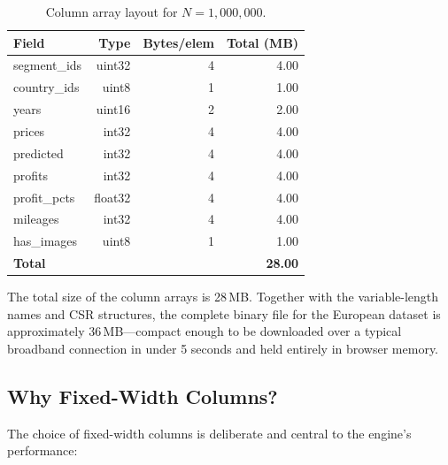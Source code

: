 \documentclass[11pt,a4paper,twoside]{book}
\begin{document}
\begin{table}[H]
\centering
\caption{Column array layout for $N = 1,\!000,\!000$.}
\label{tab:columns}
\begin{tabular}{@{}lrrr@{}}
\toprule
\textbf{Field} & \textbf{Type} & \textbf{Bytes/elem} & \textbf{Total (MB)} \\
\midrule
segment\_ids & uint32 & 4 & 4.00 \\
country\_ids & uint8  & 1 & 1.00 \\
years        & uint16 & 2 & 2.00 \\
prices       & int32  & 4 & 4.00 \\
predicted    & int32  & 4 & 4.00 \\
profits      & int32  & 4 & 4.00 \\
profit\_pcts & float32& 4 & 4.00 \\
mileages     & int32  & 4 & 4.00 \\
has\_images  & uint8  & 1 & 1.00 \\
\midrule
\textbf{Total} & & & \textbf{28.00} \\
\bottomrule
\end{tabular}
\end{table}

The total size of the column arrays is 28\,MB. Together with the variable-length names and CSR
structures, the complete binary file for the European dataset is approximately 36\,MB---compact
enough to be downloaded over a typical broadband connection in under 5 seconds and held entirely
in browser memory.

\subsection{Why Fixed-Width Columns?}

The choice of fixed-width columns is deliberate and central to the engine's performance:
\end{document}
